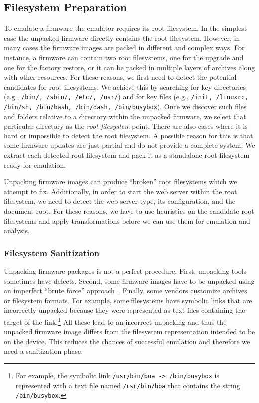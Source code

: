 \documentclass[conference]{./templates/ndss/IEEEtran}
\newcounter{t0d0_counter}
\newcounter{pr00f_counter}
\begin{document}
\subsection{Filesystem Preparation}
\label{sec:preprocessing-files}

To emulate a firmware the emulator requires its root filesystem. 
In the simplest case the unpacked firmware 
directly contains the root filesystem. However, in many cases the 
firmware images are packed in different and complex ways. For instance, 
a firmware can contain two root filesystems, one for the upgrade and 
one for the factory restore, or it can be packed in multiple layers 
of archives along with other resources. For these reasons, we first need 
to detect the potential candidates for root filesystems. We achieve this 
by searching for key directories (e.g., \texttt{/bin/, /sbin/, /etc/, /usr/}) 
and for key files (e.g., \texttt{/init, /linuxrc, /bin/sh, /bin/bash, /bin/dash, /bin/busybox}). 
Once we discover such files and folders relative to a directory within 
the unpacked firmware, we select that 
particular directory as the \emph{root filesystem} point. There are also cases where it is hard or impossible to detect the root 
filesystem. A possible reason for this is that some firmware updates are just 
partial and do not provide a complete system. 
We extract each detected root filesystem and pack it as a standalone
root filesystem ready for emulation.


Unpacking firmware images can produce ``broken'' root filesystems which we attempt to 
fix. Additionally, in order to start the web server within 
the root filesystem, we need to detect the web server type, its configuration, and 
the document root. 
For these reasons, we have to use heuristics on the candidate root filesystems 
and apply transformations before we can use them for emulation and analysis. 

\subsubsection{Filesystem Sanitization}
\label{sec:filesystem-sanitization}

Unpacking firmware packages is not a perfect procedure. First,
unpacking tools sometimes have defects. Second, some firmware images
have to be unpacked using an imperfect ``brute force''
approach~\cite{costin2014large}.  Finally, some vendors customize
archives or filesystem formats.  For example, some filesystems have 
symbolic links that are incorrectly unpacked because they were represented
as text files containing the target of the link.\footnote{For
example, the symbolic link \texttt{/usr/bin/boa -> /bin/busybox} is
represented with a text file named \texttt{/usr/bin/boa} that
contains the string \texttt{/bin/busybox}.} All these lead to an
incorrect unpacking and thus the unpacked firmware image differs from
the filesystem representation intended to be on the device. This
reduces the chances of successful emulation and therefore we need a
sanitization phase.
\end{document}
